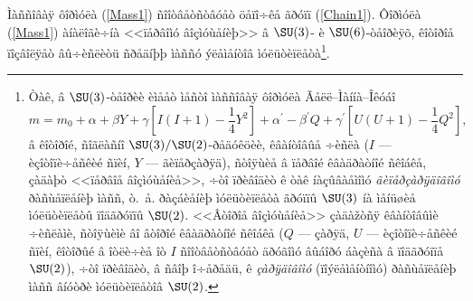 Ìàññîâàÿ ôîðìóëà (\ref{Mass1}) ñîîòâåòñòâóåò öåïî÷êå ãðóïï (\ref{Chain1}). Ôîðìóëà (\ref{Mass1}) àíàëîãè÷íà <<ïåðâîìó âîçìóùåíèþ>> â $\SU(3)$- è $\SU(6)$-òåîðèÿõ, êîòîðîå ïîçâîëÿåò âû÷èñëèòü ñðåäíþþ ìàññó ýëåìåíòîâ ìóëüòèïëåòà\footnote{Òàê, â $\SU(3)$-òåîðèè èìååò ìåñòî ìàññîâàÿ ôîðìóëà Ãåëë--Ìàííà--Îêóáî
\[
m=m_0+\alpha+\beta Y+\gamma\left[I(I+1)-\frac{1}{4}Y^2\right]
+\alpha^\prime-\beta^\prime
Q+\gamma^\prime\left[U(U+1)-\frac{1}{4}Q^2\right],
\]
â êîòîðîé, ñîãëàñíî $\SU(3)/\SU(2)$-ðåäóêöèè, êâàíòîâûå ÷èñëà ($I$ --- èçîòîïè÷åñêèé ñïèí, $Y$ --- ãèïåðçàðÿä), ñòîÿùèå â ïåðâîé êâàäðàòíîé ñêîáêå, çàäàþò <<ïåðâîå âîçìóùåíèå>>, ÷òî ïðèâîäèò ê òàê íàçûâàåìîìó \textit{ãèïåðçàðÿäîâîìó} ðàñùåïëåíèþ ìàññ, ò.~å. ðàçáèåíèþ ìóëüòèïëåòà ãðóïïû $\SU(3)$ íà ìåíüøèå ìóëüòèïëåòû ïîäãðóïïû $\SU(2)$. <<Âòîðîå âîçìóùåíèå>> çàäàžòñÿ êâàíòîâûìè ÷èñëàìè, ñòîÿùèìè âî âòîðîé êâàäðàòíîé ñêîáêå ($Q$ --- çàðÿä, $U$ --- èçîòîïè÷åñêèé ñïèí, êîòîðûé â îòëè÷èå îò $I$ ñîîòâåòñòâóåò äðóãîìó âûáîðó áàçèñà â ïîäãðóïïå $\SU(2)$), ÷òî ïðèâîäèò, â ñâîþ î÷åðåäü, ê \textit{çàðÿäîâîìó} (ïîýëåìåíòíîìó) ðàñùåïëåíèþ ìàññ âíóòðè ìóëüòèïëåòîâ $\SU(2)$.
}.

